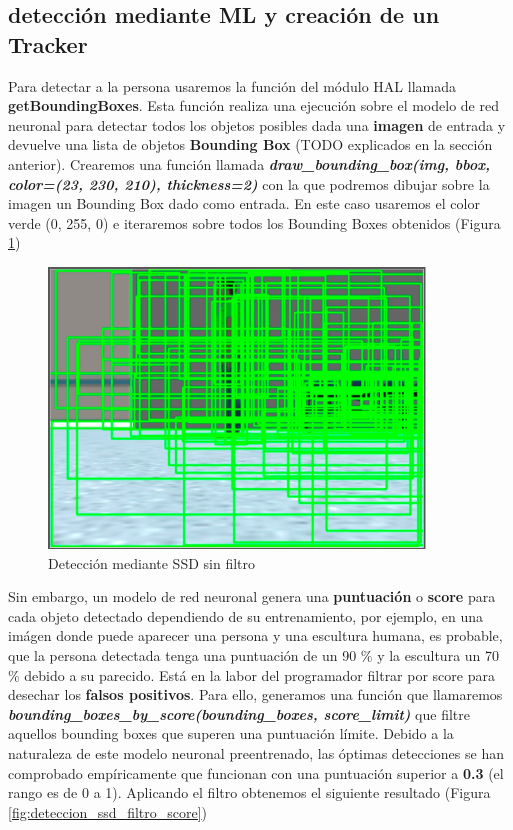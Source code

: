 \subsection{detección mediante ML y creación de un Tracker}
\label{sec:ml_tracker}
Para detectar a la persona usaremos la función del módulo HAL llamada \textbf{getBoundingBoxes}. Esta función realiza una ejecución sobre el modelo de red neuronal para detectar todos los objetos posibles dada una \textbf{imagen} de entrada y devuelve una lista de objetos \textbf{Bounding Box} (TODO explicados en la sección anterior). Crearemos una función llamada \textbf{\textit{draw\_bounding\_box(img, bbox, color=(23, 230, 210), thickness=2)}} con la que podremos dibujar sobre la imagen un Bounding Box dado como entrada. En este caso usaremos el color verde (0, 255, 0) e iteraremos sobre todos los Bounding Boxes obtenidos (Figura \ref{fig:deteccion_ssd_sin_filtro})\\

\begin{figure} [H]
  \begin{center}
    \includegraphics[width=10cm]{imagenes/deteccion-ssd-sin-filtro.png}
  \end{center}
  \caption[Detección mediante SSD sin filtro]{Detección mediante SSD sin filtro}
  \label{fig:deteccion_ssd_sin_filtro}
\end{figure}

Sin embargo, un modelo de red neuronal genera una \textbf{puntuación} o \textbf{score} para cada objeto detectado dependiendo de su entrenamiento, por ejemplo, en una imágen donde puede aparecer una persona y una escultura humana, es probable, que la persona detectada tenga una puntuación de un 90 \% y la escultura un 70 \% debido a su parecido. Está en la labor del programador filtrar por score para desechar los \textbf{falsos positivos}. Para ello, generamos una función que llamaremos \textbf{\textit{bounding\_boxes\_by\_score(bounding\_boxes, score\_limit)}} que filtre aquellos bounding boxes que superen una puntuación límite. Debido a la naturaleza de este modelo neuronal preentrenado, las óptimas detecciones se han comprobado empíricamente que funcionan con una puntuación superior a \textbf{0.3} (el rango es de 0 a 1). Aplicando el filtro obtenemos el siguiente resultado (Figura \ref{fig:deteccion_ssd_filtro_score})\\

